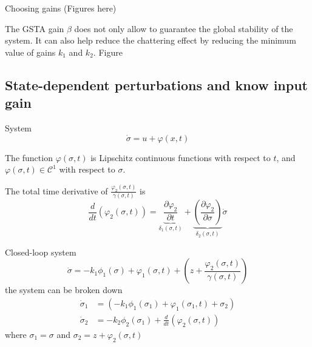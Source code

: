 Choosing gains (Figures here)
\begin{rmk}
    The GSTA gain $\beta$ does not only allow to guarantee the global stability of the system. It can also help reduce the chattering effect by reducing the minimum value of gains $k_1$ and $k_2$. Figure
\end{rmk}

\subsection{State-dependent perturbations and know input gain}
System
\begin{equation}
    \dot{\sigma} = u + \varphi(x, t)
    \label{eq:castillo-17}
\end{equation}
\begin{assumption}
    The function $\varphi(\sigma, t)$ is Lipschitz continuous functions with respect to $t$, and $\varphi(\sigma, t) \in \mathcal{C}^1$ with respect to $\sigma$.
\end{assumption}
\begin{assumption}
    The total time derivative of $\frac{\varphi_2(\sigma, t)}{\gamma(\sigma, t)}$ is 
            \begin{equation}
               \frac{d}{dt}\left(\varphi_2(\sigma, t)\right) = 
               \underbrace{\frac{\partial \varphi_2}{\partial t}}_{\delta_1(\sigma, t)} + 
               \underbrace{\left(\frac{\partial \varphi_2}{\partial \sigma}\right)}_{\delta_2(\sigma, t)}\dot{\sigma}
            \end{equation}
\end{assumption}

Closed-loop system
\begin{equation}
    \dot{\sigma} = -k_1\phi_1(\sigma) + \varphi_1(\sigma, t) + \left(z + \frac{\varphi_2(\sigma, t)}{\gamma(\sigma, t)}\right)
\end{equation}
the system can be broken down
\begin{equation}
    \begin{split}
    \dot{\sigma}_1 &= \left(-k_1\phi_1(\sigma_1) + \varphi_1(\sigma_1,t) + \sigma_2\right)\\
    \dot{\sigma}_2 &= -k_2\phi_2(\sigma_1)+ \frac{d}{dt}\left(\varphi_2(\sigma, t)\right)
    \end{split}
\end{equation}
where $\sigma_1 = \sigma$ and $\sigma_2 = z + \varphi_2(\sigma, t)$

